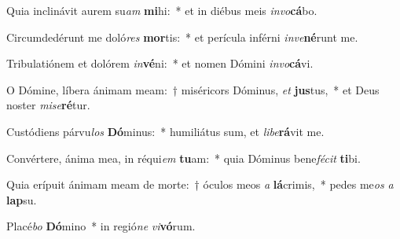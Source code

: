 \item Quia inclinávit aurem su\textit{am} \textbf{mi}hi:~* et in diébus meis \textit{in}\textit{vo}\textbf{cá}bo.
\item Circumdedérunt me doló\textit{res} \textbf{mor}tis:~* et perícula inférni \textit{in}\textit{ve}\textbf{né}runt me.
\item Tribulatiónem et dolórem \textit{in}\textbf{vé}ni:~* et nomen Dómini \textit{in}\textit{vo}\textbf{cá}vi.
\item O Dómine, líbera ánimam meam:~† miséricors Dóminus, \textit{et} \textbf{jus}tus,~* et Deus noster \textit{mi}\textit{se}\textbf{ré}tur.
\item Custódiens párvu\textit{los} \textbf{Dó}minus:~* humiliátus sum, et \textit{li}\textit{be}\textbf{rá}vit me.
\item Convértere, ánima mea, in réqui\textit{em} \textbf{tu}am:~* quia Dóminus bene\textit{fé}\textit{cit} \textbf{ti}bi.
\item Quia erípuit ánimam meam de morte:~† óculos meos \textit{a} \textbf{lá}crimis,~* pedes me\textit{os} \textit{a} \textbf{lap}su.
\item Placé\textit{bo} \textbf{Dó}mino~* in regió\textit{ne} \textit{vi}\textbf{vó}rum.
